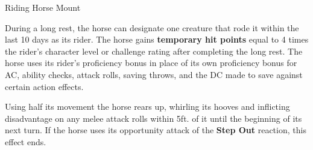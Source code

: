 \documentclass[letterpaper,twocolumn,openany,nodeprecatedcode]{dndbook}
\begin{document}
\begin{DndMonster}[float*=b,width=\textwidth + 8pt]{Riding Horse Mount}
  \begin{multicols}{2}

    \DndMonsterBasics[
        armor-class = {10 + PB},
        hit-points  = {\DndDice{2d10 + 2}},
        speed       = {60 ft.},
      ]

    \DndMonsterAbilityScores[
        str = 16,
        dex = 10,
        con = 12,
        int = 2,
        wis = 11,
        cha = 7,
      ]

    \DndMonsterDetails[
        senses = {passive Perception 10},
        languages = {-},
        challenge = 1/4,
      ]

    During a long rest, the horse can designate one creature that rode it within the last 10 days as its rider. The horse gains \textbf{temporary hit points} equal to 4 times the rider’s character level or challenge rating after completing the long rest. The horse uses its rider’s proficiency bonus in place of its own proficiency bonus for AC, ability checks, attack rolls, saving throws, and the DC made to save against certain action effects.


    \DndMonsterAttack[
      name=Combat Stomp,
      distance=melee, %
      mod={+2 + PB},
      dmg=\DndDice{2d4 + 3},
      dmg-type=bludgeoning,
      extra={. If the target is a Medium or smaller creature, it must succeed on a DC 11 + PB Strength saving throw or be knocked prone.}
    ]

    Using half its movement the horse rears up, whirling its hooves and inflicting disadvantage on any melee attack rolls within 5ft. of it until the beginning of its next turn. If the horse uses its opportunity attack of the \textbf{Step Out} reaction, this effect ends.


\end{multicols}
\end{DndMonster}
\end{document}
